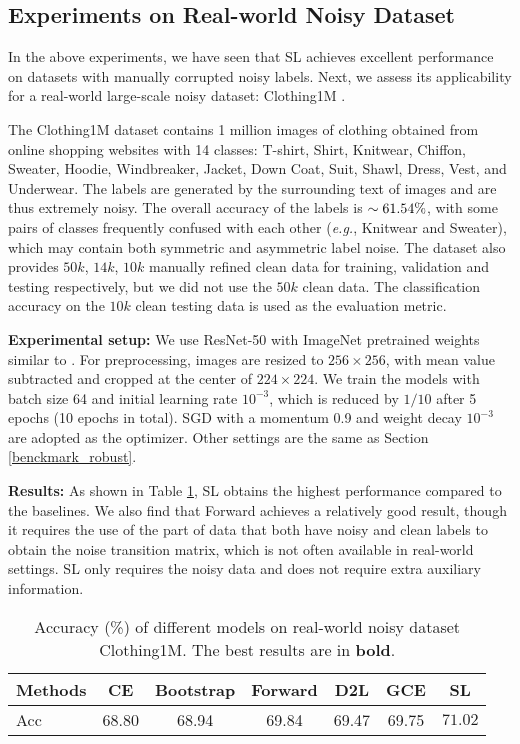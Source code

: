 \documentclass[10pt,twocolumn,letterpaper]{article}
\begin{document}
\subsection{Experiments on Real-world Noisy Dataset}\label{sec:Clothing1M}
In the above experiments, we have seen that SL achieves excellent performance on datasets with manually corrupted noisy labels. Next, we assess its applicability for a real-world large-scale noisy dataset: Clothing1M \cite{xiao2015learning}. 

The Clothing1M dataset contains 1 million images of clothing obtained from online shopping websites with 14 classes: T-shirt, Shirt, Knitwear, Chiffon, Sweater, Hoodie, Windbreaker, Jacket, Down Coat, Suit, Shawl, Dress, Vest, and Underwear. The labels are generated by the surrounding text of images and are thus extremely noisy. The overall accuracy of the labels is ${\small\sim61.54\%}$, with some pairs of classes frequently confused with each other (\textit{e.g.}, Knitwear and Sweater), which may contain both symmetric and asymmetric label noise. The dataset also provides $50k$, $14k$, $10k$ manually refined clean data for training, validation and testing respectively, but we did not use the $50k$ clean data. The classification accuracy on the $10k$ clean testing data is used as the evaluation metric. 

\noindent\textbf{Experimental setup:} 
We use ResNet-50 with ImageNet pretrained weights  similar to \cite{patrini2017making,xiao2015learning}. For preprocessing, images are resized to $256 \times 256$, with mean value subtracted and cropped at the center of $224 \times 224$. We train the models with batch size 64 and initial learning rate $10^{-3}$, which is reduced by $1/10$ after 5 epochs (10 epochs in total). SGD with a momentum 0.9 and weight decay $10^{-3}$ are adopted as the optimizer. Other settings are the same as Section \ref{benckmark_robust}. 

\noindent\textbf{Results:} 
As shown in Table \ref{tab:clothing}, SL obtains the highest performance compared to the baselines.  We also find that Forward achieves a relatively good result, though it requires the use of the part of data that both have noisy and clean labels to obtain the noise transition matrix, which is not often available in real-world settings. SL only requires the noisy data and does not require extra auxiliary information.

\begin{table}[!t]
\centering
\small
\caption{Accuracy (\%) of different models on real-world noisy dataset Clothing1M. The best results are in \textbf{bold}.}
\vspace{-0.1 in}
\label{tab:clothing}
\begin{adjustbox}{width=0.49\textwidth}
\begin{tabular}{l|cccccc}
\hline
Methods & CE & Bootstrap & Forward & D2L & GCE & \textbf{SL}\\ \hline
Acc & 68.80 & 68.94 & 69.84 & 69.47 & 69.75 & $\bm{71.02}$\\
\hline
\end{tabular}
\end{adjustbox}
\vspace{-0.15 in}
\end{table}
\end{document}

